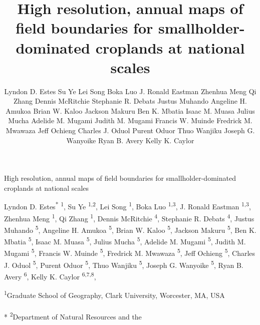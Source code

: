 \documentclass[11pt,a4paper]{article}
\title{High resolution, annual maps of field boundaries for
smallholder-dominated croplands at national scales}
\author{
Lyndon D. Estes
Su Ye
Lei Song
Boka Luo
J. Ronald Eastman
Zhenhua Meng
Qi Zhang
Dennis McRitchie
Stephanie R. Debats
Justus Muhando
Angeline H. Amukoa
Brian W. Kaloo
Jackson Makuru
Ben K. Mbatia
Isaac M. Muasa
Julius Mucha
Adelide M. Mugami
Judith M. Mugami
Francis W. Muinde
Fredrick M. Mwawaza
Jeff Ochieng
Charles J. Oduol
Purent Oduor
Thuo Wanjiku
Joseph G. Wanyoike
Ryan B. Avery
Kelly K. Caylor
}
\date{}
\begin{document}
\begin{singlespace}
\begin{center}
\huge High resolution, annual maps of field boundaries for
smallholder-dominated croplands at national scales
\end{center}
\begin{center}
\large
Lyndon D. Estes\textsuperscript{*} \textsuperscript{1}, 
Su Ye \textsuperscript{1,2}, 
Lei Song \textsuperscript{1}, 
Boka Luo \textsuperscript{1,3}, 
J. Ronald Eastman \textsuperscript{1,3}, 
Zhenhua Meng \textsuperscript{1}, 
Qi Zhang \textsuperscript{1}, 
Dennis McRitchie \textsuperscript{4}, 
Stephanie R. Debats \textsuperscript{4}, 
Justus Muhando \textsuperscript{5}, 
Angeline H. Amukoa \textsuperscript{5}, 
Brian W. Kaloo \textsuperscript{5}, 
Jackson Makuru \textsuperscript{5}, 
Ben K. Mbatia \textsuperscript{5}, 
Isaac M. Muasa \textsuperscript{5}, 
Julius Mucha \textsuperscript{5}, 
Adelide M. Mugami \textsuperscript{5}, 
Judith M. Mugami \textsuperscript{5}, 
Francis W. Muinde \textsuperscript{5}, 
Fredrick M. Mwawaza \textsuperscript{5}, 
Jeff Ochieng \textsuperscript{5}, 
Charles J. Oduol \textsuperscript{5}, 
Purent Oduor \textsuperscript{5}, 
Thuo Wanjiku \textsuperscript{5}, 
Joseph G. Wanyoike \textsuperscript{5}, 
Ryan B. Avery \textsuperscript{6}, 
Kelly K. Caylor \textsuperscript{6,7,8}, 
\end{center}
\begin{justify}
\footnotesize\textsuperscript{1}Graduate School of Geography, Clark
University, Worcester, MA, USA\\\\*
\footnotesize\textsuperscript{2}Department of Natural Resources and the

\end{justify}
\end{singlespace}
\end{document}
